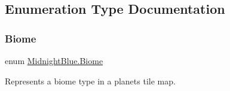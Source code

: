 \subsection{Enumeration Type Documentation}
\hypertarget{namespace_midnight_blue_a8a6ba5637b64c3eb991f00d48decf381}{}\label{namespace_midnight_blue_a8a6ba5637b64c3eb991f00d48decf381} 
\subsubsection{\texorpdfstring{Biome}{Biome}}
{\footnotesize\ttfamily enum \hyperlink{namespace_midnight_blue_a8a6ba5637b64c3eb991f00d48decf381}{Midnight\+Blue.\+Biome}\hspace{0.3cm}{\ttfamily [strong]}}



Represents a biome type in a planets tile map. 

